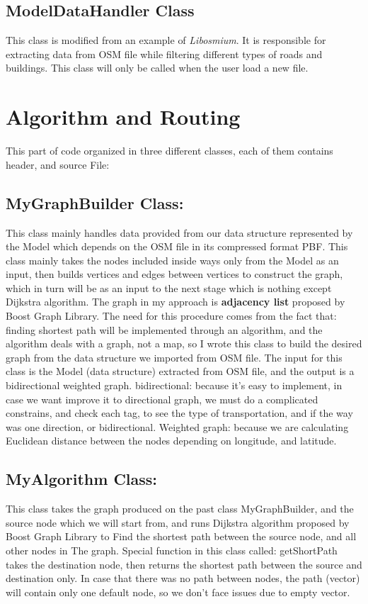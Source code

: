 \documentclass[a4paper, 12pt, english]{book}
\begin{document}
\subsection{ModelDataHandler Class}

This class is modified from an example of {\textit{Libosmium}}. It is responsible for extracting data from OSM file while filtering different types of roads and buildings. This class will only be called when the user load a new file.

\section{Algorithm and Routing}

This part of code organized in three different classes, each of them contains header, and source File:
\subsection{ MyGraphBuilder Class:}
This class mainly handles data provided from our data structure represented by the Model which depends on the OSM file in its compressed format PBF.
This class mainly takes the nodes included inside ways only from the
Model as an input, then builds vertices and edges between vertices to construct the graph, which in turn will be as an input to the next stage which is nothing except Dijkstra algorithm.
The graph in my approach is \textbf{adjacency list }proposed by Boost Graph Library.
The need for this procedure comes from the fact that: finding shortest path will be implemented through an algorithm, and the algorithm deals with a graph, not a map, so I wrote this class to build the desired graph from the data structure we imported from OSM file.
The input for this class is the Model (data structure) extracted from OSM file, 
and the output is a bidirectional weighted graph.
bidirectional: because it’s easy to implement, in case we want improve it to directional graph, we must do a complicated constrains, and check each tag, to see the type of transportation, and if the way was one direction, or bidirectional.
Weighted graph: because we are calculating Euclidean distance between the nodes depending on longitude, and latitude.
\subsection{ MyAlgorithm Class:}
This class takes the graph produced on the past class MyGraphBuilder, and the source node which we will start from, and runs Dijkstra algorithm proposed by Boost Graph Library to Find the shortest path between the source node, and all other nodes in The graph.
Special function in this class called: getShortPath takes the destination node, then returns the shortest path between the source and destination only.
In case that there was no path between nodes, the path (vector) will contain only one default node, so we don’t face issues due to empty vector.
\end{document}
